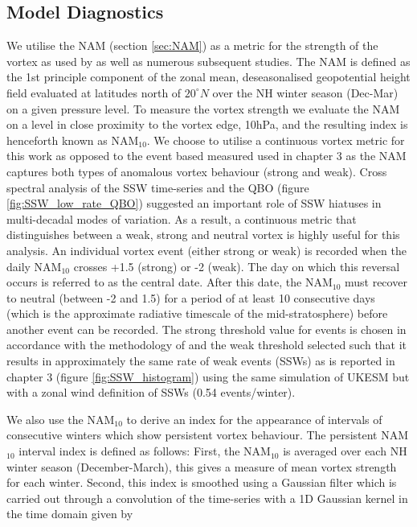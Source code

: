 \subsection{Model Diagnostics}
\label{sec:model_diagnostics_surface}
We utilise the NAM (section \ref{sec:NAM}) as a metric for the strength of the vortex as used by \cite{baldwinStratospheric2001a} as well as numerous subsequent studies. The NAM is defined as the 1st principle component of the zonal mean, deseasonalised geopotential height field evaluated at latitudes north of $20^{\circ}N$ over the NH winter season (Dec-Mar) on a given pressure level. To measure the vortex strength we evaluate the NAM on a level in close proximity to the vortex edge, 10hPa, and the resulting index is henceforth known as NAM$_{10}$. We choose to utilise a continuous vortex metric for this work as opposed to the event based measured used in chapter 3 as the NAM captures both types of anomalous vortex behaviour (strong and weak). Cross spectral analysis of the SSW time-series and the QBO (figure \ref{fig:SSW_low_rate_QBO}) suggested an important role of SSW hiatuses in multi-decadal modes of variation. As a result, a continuous metric that distinguishes between a weak, strong and neutral vortex is highly useful for this analysis. An individual vortex event (either strong or weak) is recorded when the daily NAM$_{10}$ crosses +1.5 (strong) or -2 (weak). The day on which this reversal occurs is referred to as the central date. After this date, the NAM$_10$ must recover to neutral (between -2 and 1.5) for a period of at least 10 consecutive days (which is the approximate radiative timescale of the mid-stratosphere) before another event can be recorded. The strong threshold value for events is chosen in accordance with the methodology of \cite{baldwinStratospheric2001a} and the weak threshold selected such that it results in approximately the same rate of weak events (SSWs) as is reported in chapter 3 (figure \ref{fig:SSW_histogram}) using the same simulation of UKESM but with a zonal wind definition of SSWs (0.54 events/winter).

We also use the NAM$_{10}$ to derive an index for the appearance of intervals of consecutive winters which show persistent vortex behaviour. The persistent NAM$_{10}$ interval index is defined as follows: First, the NAM$_{10}$ is averaged over each NH winter season (December-March), this gives a measure of mean vortex strength for each winter. Second, this index is smoothed using a Gaussian filter which is carried out through a convolution of the time-series with a 1D Gaussian kernel in the time domain given by

